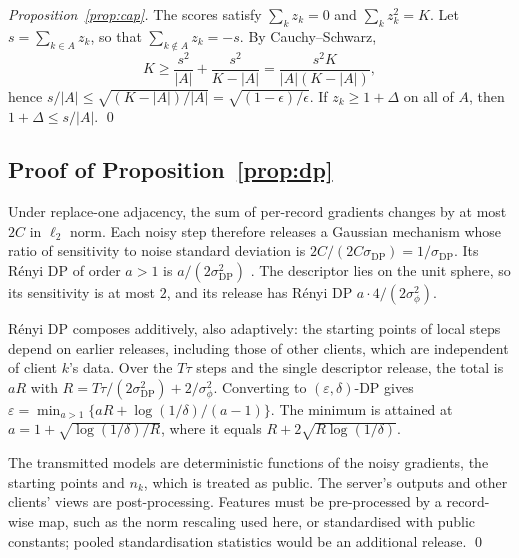 \emph{Proposition~\ref{prop:cap}.} The scores satisfy $\sum_kz_k=0$ and $\sum_kz_k^2=K$. Let
$s=\sum_{k\in A}z_k$, so that $\sum_{k\notin A}z_k=-s$. By Cauchy--Schwarz,
\[
  K\ge\frac{s^2}{|A|}+\frac{s^2}{K-|A|}=\frac{s^2K}{|A|(K-|A|)},
\]
hence $s/|A|\le\sqrt{(K-|A|)/|A|}=\sqrt{(1-\epsilon)/\epsilon}$. If $z_k\ge1+\Delta$ on all
of $A$, then $1+\Delta\le s/|A|$.
\qed

\subsection{Proof of Proposition~\ref{prop:dp}}
\label{app:proof_dp}
Under replace-one adjacency, the sum of per-record gradients changes by at most $2C$ in
$\ell_2$ norm. Each noisy step therefore releases a Gaussian mechanism whose ratio of
sensitivity to noise standard deviation is $2C/(2C\sigma_{\mathrm{DP}})=1/\sigma_{\mathrm{DP}}$.
Its R\'enyi DP of order $a>1$ is $a/(2\sigma_{\mathrm{DP}}^2)$ \citep{mironov2017renyi}.
The descriptor lies on the unit sphere, so its sensitivity is at most $2$, and its release
has R\'enyi DP $a\cdot4/(2\sigma_\phi^2)$.

R\'enyi DP composes additively, also adaptively: the starting points of local steps depend
on earlier releases, including those of other clients, which are independent of client
$k$'s data. Over the $T\tau$ steps and the single descriptor release, the total is $aR$ with
$R=T\tau/(2\sigma_{\mathrm{DP}}^2)+2/\sigma_\phi^2$. Converting to $(\varepsilon,\delta)$-DP
\citep[Prop.~3]{mironov2017renyi} gives $\varepsilon=\min_{a>1}\{aR+\log(1/\delta)/(a-1)\}$.
The minimum is attained at $a=1+\sqrt{\log(1/\delta)/R}$, where it equals
$R+2\sqrt{R\log(1/\delta)}$.

The transmitted models are deterministic functions of the noisy gradients, the starting
points and $n_k$, which is treated as public. The server's outputs and other clients' views
are post-processing. Features must be pre-processed by a record-wise map, such as the norm
rescaling used here, or standardised with public constants; pooled standardisation
statistics would be an additional release.
\qed
